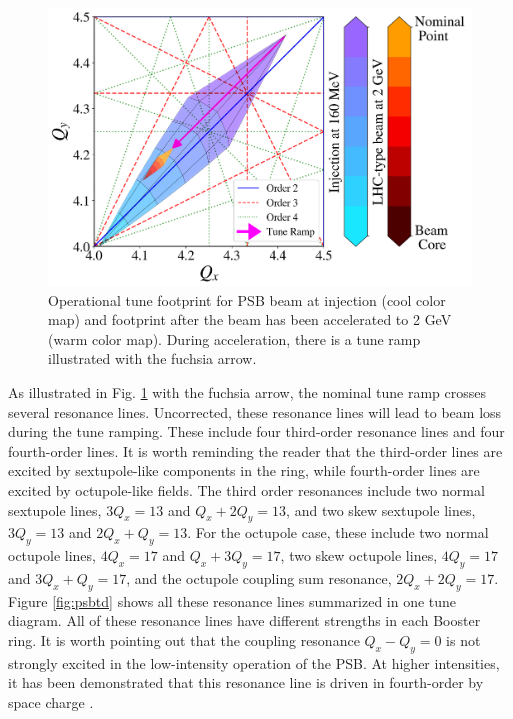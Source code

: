 \begin{figure}[H]
    \centering
    \includegraphics[width=\linewidth,keepaspectratio]{chapter5/operational.png}
    \caption{Operational tune footprint for PSB beam at injection (cool color map) and footprint after the beam has been accelerated to 2 GeV (warm color map). During acceleration, there is a tune ramp illustrated with the fuchsia arrow.}
    \label{fig:operational_psb}
\end{figure}

As illustrated in Fig. \ref{fig:operational_psb} with the fuchsia arrow, the nominal tune ramp crosses several resonance lines. Uncorrected, these resonance lines will lead to beam loss during the tune ramping. These include four third-order resonance lines and four fourth-order lines. It is worth reminding the reader that the third-order lines are excited by sextupole-like components in the ring, while fourth-order lines are excited by octupole-like fields. The third order resonances include two normal sextupole lines, $3Q_x = 13$ and $Q_x+2Q_y = 13$, and two skew sextupole lines, $3Q_y = 13$ and $2Q_x+Q_y = 13$. For the octupole case, these include two normal octupole lines, $4Q_x = 17$ and $Q_x+3Q_y = 17$, two skew octupole lines, $4Q_y = 17$ and $3Q_x+Q_y = 17$, and the octupole coupling sum resonance, $2Q_x +2Q_y =17$. Figure \ref{fig:psbtd} shows all these resonance lines summarized in one tune diagram. All of these resonance lines have different strengths in each Booster ring. It is worth pointing out that the coupling resonance $Q_x - Q_y = 0$ is not strongly excited in the low-intensity operation of the PSB. At higher intensities, it has been demonstrated that this resonance line is driven in fourth-order by space charge \cite{foteinithesis}.

